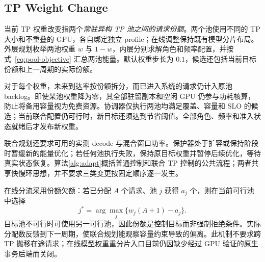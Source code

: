 \documentclass[11pt,a4paper,twocolumn]{article}
\begin{document}
\subsection{TP Weight Change}
当前 TP 权重改变指两个\emph{常驻异构 TP 池之间的请求份额}。两个池使用不同的 TP 大小和不重叠的 GPU，各自绑定独立 profile；在线调整保持既有模型分片布局。外层规划枚举两池权重 $w$ 与 $1-w$，内层分别求解角色和频率配置，并按式~\eqref{eq:pool-objective} 汇总两池能量。默认权重步长为 $0.1$，候选还包括当前目标份额和上一周期的实际份额。

对于每个权重，未来到达率按份额拆分，而已进入系统的请求仍计入原池 backlog。即使某池权重降为零，其全部驻留副本和空闲 GPU 仍参与功耗核算，防止将备用容量视为免费资源。协调器仅执行两池均满足覆盖、容量和 SLO 的候选；当前联合配置仍可行时，新目标还须达到节省阈值。全部角色、频率和准入状态就绪后才发布新权重。

联合规划还要求可用的实测 decode 与混合窗口功率。保护器处于扩容或保持阶段时暂缓新的能量优化；若任何池执行失败，保持原目标权重并暂停后续优化，等待真实状态恢复。算法\ref{alg:adapt}概括普通控制和联合 TP 控制的公共流程；两者共享快慢环思想，并不要求三类变更按固定顺序逐一发生。

在线分流采用份额欠额：若已分配 $A$ 个请求、池 $j$ 获得 $a_j$ 个，则在当前可行池中选择
\begin{equation}
 j^*=\arg\max_j\{w_j(A+1)-a_j\}.
\end{equation}
目标池不可行时可使用另一可行池，因此份额是控制目标而非强制拒绝条件。实际分配数反馈到下一周期，使联合规划能观察容量约束导致的偏离。此机制不要求跨 TP 搬移在途请求；在线模型权重重分片入口目前仍因缺少经过 GPU 验证的原生事务后端而关闭。
\end{document}
